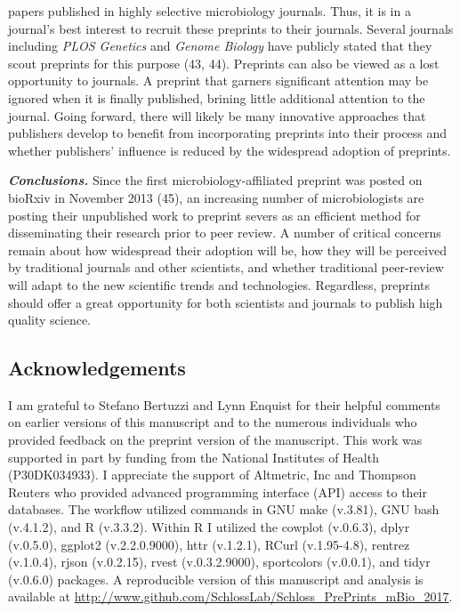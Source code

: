\documentclass[11pt,]{article}
\begin{document}
papers published in highly selective microbiology journals. Thus, it is
in a journal's best interest to recruit these preprints to their
journals. Several journals including \emph{PLOS Genetics} and
\emph{Genome Biology} have publicly stated that they scout preprints for
this purpose (43, 44). Preprints can also be viewed as a lost
opportunity to journals. A preprint that garners significant attention
may be ignored when it is finally published, brining little additional
attention to the journal. Going forward, there will likely be many
innovative approaches that publishers develop to benefit from
incorporating preprints into their process and whether publishers'
influence is reduced by the widespread adoption of preprints.

\textbf{\emph{Conclusions.}} Since the first microbiology-affiliated
preprint was posted on bioRxiv in November 2013 (45), an increasing
number of microbiologists are posting their unpublished work to preprint
severs as an efficient method for disseminating their research prior to
peer review. A number of critical concerns remain about how widespread
their adoption will be, how they will be perceived by traditional
journals and other scientists, and whether traditional peer-review will
adapt to the new scientific trends and technologies. Regardless,
preprints should offer a great opportunity for both scientists and
journals to publish high quality science.

\subsection{Acknowledgements}\label{acknowledgements}

I am grateful to Stefano Bertuzzi and Lynn Enquist for their helpful
comments on earlier versions of this manuscript and to the numerous
individuals who provided feedback on the preprint version of the
manuscript. This work was supported in part by funding from the National
Institutes of Health (P30DK034933). I appreciate the support of
Altmetric, Inc and Thompson Reuters who provided advanced programming
interface (API) access to their databases. The workflow utilized
commands in GNU make (v.3.81), GNU bash (v.4.1.2), and R (v.3.3.2).
Within R I utilized the cowplot (v.0.6.3), dplyr (v.0.5.0), ggplot2
(v.2.2.0.9000), httr (v.1.2.1), RCurl (v.1.95-4.8), rentrez (v.1.0.4),
rjson (v.0.2.15), rvest (v.0.3.2.9000), sportcolors (v.0.0.1), and tidyr
(v.0.6.0) packages. A reproducible version of this manuscript and
analysis is available at
\url{http://www.github.com/SchlossLab/Schloss_PrePrints_mBio_2017}.
\end{document}
